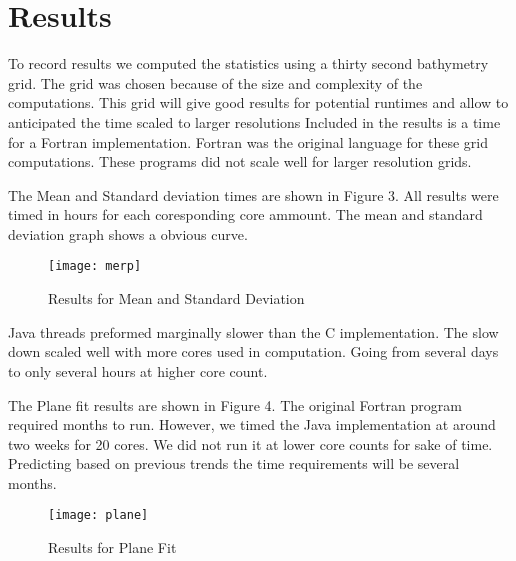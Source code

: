 \section{Results}
To record results we computed the statistics using a thirty second bathymetry grid.
The grid was chosen because of the size and complexity of the computations.
This grid will give good results for potential runtimes and allow to anticipated the time scaled to larger resolutions
Included in the results is a time for a Fortran implementation.
Fortran was the original language for these grid computations.
These programs did not scale well for larger resolution grids.

\par
The Mean and Standard deviation times are shown in Figure 3.
All results were timed in hours for each coresponding core ammount.
The mean and standard deviation graph shows a obvious curve.
\begin{figure}[h]
    \centering
    \texttt{[image: merp]}
    \caption{Results for Mean and Standard Deviation}
\end{figure}

\par
Java threads preformed marginally slower than the C implementation.
The slow down scaled well with more cores used in computation.
Going from several days to only several hours at higher core count.

\par
The Plane fit results are shown in Figure 4.
The original Fortran program required months to run.
However, we timed the Java implementation at around two weeks for 20 cores.
We did not run it at lower core counts for sake of time.
Predicting based on previous trends the time requirements will be several months.

\begin{figure}[h]
    \centering
    \texttt{[image: plane]}
    \caption{Results for Plane Fit}
\end{figure}

